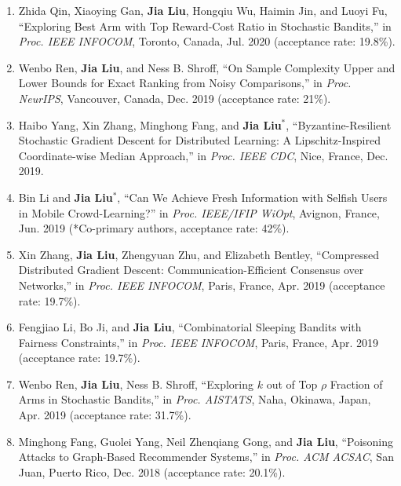 \documentclass[overlapped,line,letterpaper]{res1}
\begin{document}
\begin{resume}
\begin{enumerate}
\vspace*{.08in} \item Zhida Qin, Xiaoying Gan, {\bf Jia Liu}, Hongqiu Wu, Haimin Jin, and Luoyi Fu, ``Exploring Best Arm with Top Reward-Cost Ratio in Stochastic Bandits,'' in {\em Proc. IEEE INFOCOM}, Toronto, Canada, Jul. 2020 (acceptance rate: 19.8\%).

\vspace*{.08in} \item Wenbo Ren, {\bf Jia Liu}, and Ness B. Shroff, ``On Sample Complexity Upper and Lower Bounds for Exact Ranking from Noisy Comparisons,'' in {\em Proc. NeurIPS}, Vancouver, Canada, Dec. 2019 (acceptance rate: 21\%).

\vspace*{.08in} \item Haibo Yang, Xin Zhang, Minghong Fang, and \textbf{Jia Liu}$^*$, ``Byzantine-Resilient Stochastic Gradient Descent for Distributed Learning: A Lipschitz-Inspired Coordinate-wise Median Approach,'' in {\em Proc. IEEE CDC}, Nice, France, Dec. 2019.

\vspace*{.08in} \item Bin Li and \textbf{Jia Liu}$^*$, ``Can We Achieve Fresh Information with Selfish Users in Mobile Crowd-Learning?'' in {\em Proc. IEEE/IFIP WiOpt}, Avignon, France, Jun. 2019 (*Co-primary authors, acceptance rate: 42\%).

\vspace*{.08in} \item Xin Zhang, \textbf{Jia Liu}, Zhengyuan Zhu, and Elizabeth Bentley, ``Compressed Distributed Gradient Descent: Communication-Efficient Consensus over Networks,'' in {\em Proc. IEEE INFOCOM}, Paris, France, Apr. 2019 (acceptance rate: 19.7\%).

\vspace*{.08in} \item Fengjiao Li, Bo Ji, and \textbf{Jia Liu}, ``Combinatorial Sleeping Bandits with Fairness Constraints,'' in {\em Proc. IEEE INFOCOM}, Paris, France, Apr. 2019 (acceptance rate: 19.7\%).

\vspace*{.08in} \item Wenbo Ren, \textbf{Jia Liu}, Ness B. Shroff, ``Exploring $k$ out of Top $\rho$ Fraction of Arms in Stochastic Bandits,'' in {\em Proc. AISTATS}, Naha, Okinawa, Japan, Apr. 2019 (acceptance rate: 31.7\%).

\vspace*{.08in} \item Minghong Fang, Guolei Yang, Neil Zhenqiang Gong, and \textbf{Jia Liu}, ``Poisoning Attacks to Graph-Based Recommender Systems,'' in {\em Proc. ACM ACSAC}, San Juan, Puerto Rico, Dec. 2018 (acceptance rate: 20.1\%).


\end{enumerate}
\end{resume}
\end{document}
